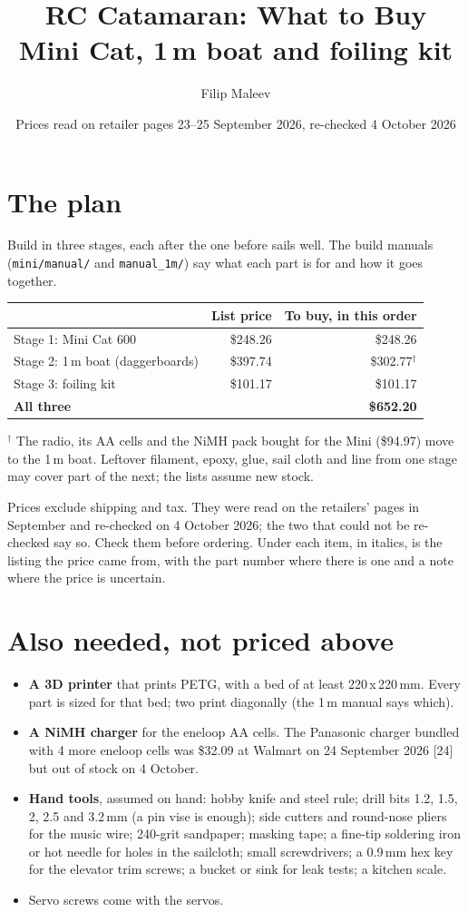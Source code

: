 \documentclass[11pt]{article}
\title{\textbf{RC Catamaran: What to Buy}\\\large Mini Cat, 1\,m boat and foiling kit}
\author{Filip Maleev}
\date{Prices read on retailer pages 23--25 September 2026, re-checked 4 October 2026}
\begin{document}
\maketitle

\section*{The plan}
Build in three stages, each after the one before sails well. The build manuals (\texttt{mini/manual/} and \texttt{manual\_1m/}) say what each part is for and how it goes together.
\begin{center}
\begin{tabular}{lrr}
\toprule
 & List price & To buy, in this order \\
\midrule
Stage 1: Mini Cat 600 & \$248.26 & \$248.26 \\
Stage 2: 1\,m boat (daggerboards) & \$397.74 & \$302.77$^\dagger$ \\
Stage 3: foiling kit & \$101.17 & \$101.17 \\
\midrule
\textbf{All three} & & \textbf{\$652.20} \\
\bottomrule
\end{tabular}
\end{center}
$^\dagger$ The radio, its AA cells and the NiMH pack bought for the Mini (\$94.97) move to the 1\,m boat. Leftover filament, epoxy, glue, sail cloth and line from one stage may cover part of the next; the lists assume new stock.

Prices exclude shipping and tax. They were read on the retailers' pages in September and re-checked on 4 October 2026; the two that could not be re-checked say so. Check them before ordering. Under each item, in italics, is the listing the price came from, with the part number where there is one and a note where the price is uncertain.

\section*{Also needed, not priced above}
\begin{itemize}
\item \textbf{A 3D printer} that prints PETG, with a bed of at least 220\,x\,220\,mm. Every part is sized for that bed; two print diagonally (the 1\,m manual says which).
\item \textbf{A NiMH charger} for the eneloop AA cells. The Panasonic charger bundled with 4 more eneloop cells was \$32.09 at Walmart on 24 September 2026 [24] but out of stock on 4 October.
\item \textbf{Hand tools}, assumed on hand: hobby knife and steel rule; drill bits 1.2, 1.5, 2, 2.5 and 3.2\,mm (a pin vise is enough); side cutters and round-nose pliers for the music wire; 240-grit sandpaper; masking tape; a fine-tip soldering iron or hot needle for holes in the sailcloth; small screwdrivers; a 0.9\,mm hex key for the elevator trim screws; a bucket or sink for leak tests; a kitchen scale.
\item Servo screws come with the servos.
\end{itemize}
\end{document}
